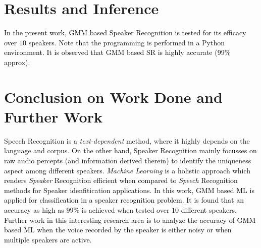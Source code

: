 \documentclass{article}
\begin{document}
\section{\textbf{{Results and Inference}}} \label{result}
\textcolor{black}{In the present work, 
GMM based Speaker Recognition is tested for its efficacy over $10$ speakers. Note that the programming is performed in a Python environment. It is observed that GMM based SR is highly accurate (99$\%$ approx).} %

\section{\textbf{{Conclusion on Work Done and Further Work}}}
Speech Recognition is a \textit{text-dependent} method, where it highly depends on the language and corpus. \textcolor{black}{On the other hand, Speaker Recognition mainly focusses on raw audio percepts (and information derived therein) %
to identify the uniqueness aspect among different speakers. \textit{Machine Learning} is a holistic approach which renders \textit{Speaker} Recognition efficient when compared to \textit{Speech} Recognition methods for Speaker idenfitication applications. %
In this work, GMM based ML is applied for classification in a speaker recognition problem. It is found that an accuracy as high as $99\%$ is achieved when tested over $10$ different speakers. Further work in this interesting research area is to analyze the accuracy of GMM based ML when the voice recorded by the speaker is either noisy or when multiple speakers are active.}
\end{document}
